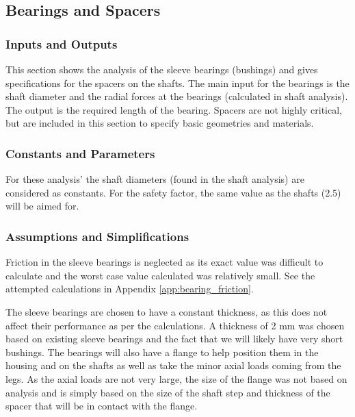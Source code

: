 \subsection{Bearings and Spacers} \label{subsec:bearings}

\subsubsection{Inputs and Outputs}
This section shows the analysis of the sleeve bearings (bushings) and gives specifications for the spacers on the shafts. The main input for the bearings is the shaft diameter and the radial forces at the bearings (calculated in shaft analysis). The output is the required length of the bearing. Spacers are not highly critical, but are included in this section to specify basic geometries and materials.

\subsubsection{Constants and Parameters}
For these analysis' the shaft diameters (found in the shaft analysis) are considered as constants. 
For the safety factor, the same value as the shafts (2.5) will be aimed for.


\subsubsection{Assumptions and Simplifications}
Friction in the sleeve bearings is neglected as its exact value was difficult to calculate and the worst case value calculated was relatively small. See the attempted calculations in Appendix \ref{app:bearing_friction}.

The sleeve bearings are chosen to have a constant thickness, as this does not affect their performance as per the calculations. A thickness of 2 mm was chosen based on existing sleeve bearings \cite{quality_bearings_and_components_flanged_nodate} and the fact that we will likely have very short bushings. The bearings will also have a flange to help position them in the housing and on the shafts as well as take the minor axial loads coming from the legs. As the axial loads are not very large, the size of the flange was not based on analysis and is simply based on the size of the shaft step and thickness of the spacer that will be in contact with the flange. 

